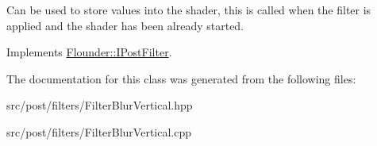 Can be used to store values into the shader, this is called when the filter is applied and the shader has been already started. 



Implements \hyperlink{class_flounder_1_1_i_post_filter_a20420ec0a9bac67437740552bea9ab74}{Flounder\+::\+I\+Post\+Filter}.



The documentation for this class was generated from the following files\+:\begin{DoxyCompactItemize}
\item 
src/post/filters/Filter\+Blur\+Vertical.\+hpp\item 
src/post/filters/Filter\+Blur\+Vertical.\+cpp\end{DoxyCompactItemize}
